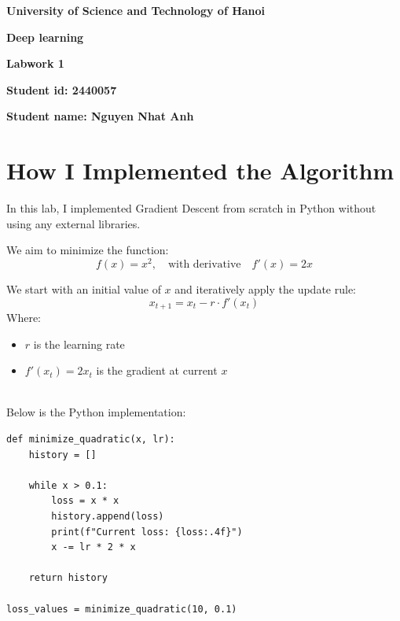 \documentclass[12pt]{article}
\begin{document}
\thispagestyle{empty} %
\begin{center}
    \vspace{7pt}
    \fontsize{18pt}{17pt}\selectfont 
    \textbf{University of Science and Technology of Hanoi}
    \vspace{7pt}
\end{center}

\vspace{90pt}

\begin{center}
    \fontsize{30pt}{17pt}\selectfont 
    \textbf{Deep learning} 
    \vspace{50pt}

    \fontsize{20pt}{17pt}\selectfont 
    \textbf{Labwork 1}
    \vspace{50pt}


    \fontsize{17pt}{17pt}\selectfont
    \textbf{{Student id: }{2440057}}
    \vspace{15pt}

    \fontsize{17pt}{17pt}\selectfont
    \textbf{{Student name: }{Nguyen Nhat Anh}}
    \vspace{15pt}
    
\end{center}

\newpage
\setcounter{page}{1} %
\section{How I Implemented the Algorithm}
In this lab, I implemented Gradient Descent from scratch in Python without using any external libraries.

We aim to minimize the function:
\[
f(x) = x^2, \quad \text{with derivative} \quad f'(x) = 2x
\]

We start with an initial value of \( x \) and iteratively apply the update rule:
\[
x_{t+1} = x_t - r \cdot f'(x_t)
\]
Where:
\begin{itemize}
  \item \( r \) is the learning rate
  \item \( f'(x_t) = 2x_t \) is the gradient at current \( x \)
\end{itemize}
\\
Below is the Python implementation:
\begin{verbatim}
def minimize_quadratic(x, lr):
    history = []

    while x > 0.1:
        loss = x * x
        history.append(loss)
        print(f"Current loss: {loss:.4f}")
        x -= lr * 2 * x

    return history

loss_values = minimize_quadratic(10, 0.1)
\end{verbatim}
\end{document}
